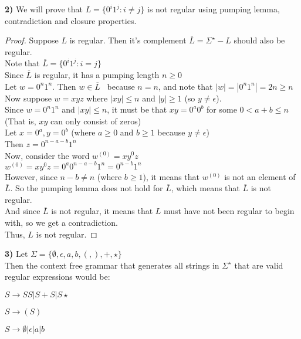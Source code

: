 \documentclass{article}
\begin{document}
\textbf{2)} We will prove that $L = \{0^i1^j: i \neq j\}$ is not regular using pumping lemma, contradiction and closure properties.
\begin{proof}
Suppose $L$ is regular. Then it's complement $\overline{L} = \Sigma^\star- L$ should also be regular.\\
Note that $\overline{L}=\{0^i1^j: i = j\}$\\
Since $\overline{L}$ is regular, it has a pumping length $n \ge 0$\\
Let $w = 0^n1^n$. Then $w \in \overline{L}$ \ because $n = n$, and note that $|w| = |0^n1^n| = 2n \ge n$\\
Now suppose $w = xyz$ where $|xy| \leq n$ and $|y| \ge 1$ (so $y \neq \epsilon$).\\
Since $w = 0^n1^n$ and $|xy| \leq n$, it must be that $xy = 0^a0^b$ for some $0 < a+b \le n$\\
(That is, $xy$ can only consist of zeros)\\
Let $x = 0^a, y = 0^b$ (where $a \ge 0$ and $b \ge 1$ because $y \neq \epsilon$)\\
Then $z = 0^{n-a-b}1^n$\\
Now, consider the word $w^{(0)} = xy^0z$\\
$w^{(0)}=xy^0z=0^a0^{n-a-b}1^n=0^{n-b}1^n$\\
However, since $n-b \neq n$ (where $b \ge 1$), it means that $w^{(0)}$ is not an element of $\overline{L}$.
So the pumping lemma does not hold for $\overline{L}$, which means that $\overline{L}$ is not regular.\\
And since $\overline{L}$ is not regular, it means that $L$ must have not been regular to begin with, so we get a contradiction.\\
Thus, $L$ is not regular.
\end{proof}

\textbf{3)} Let $\Sigma = \{\emptyset, \epsilon, a, b, (, ), +, \star\}$\\
Then the context free grammar that generates all strings in $\Sigma^\star$ that are valid regular expressions would be:

$S \rightarrow SS | S+S | S\star$

$S \rightarrow (S)$

$S \rightarrow \emptyset | \epsilon | a | b$
\end{document}
